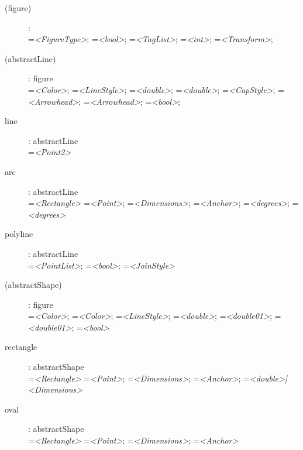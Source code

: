 \begin{description}

\item[(figure)]: \\
    =\textit{<FigureType>};
    =\textit{<bool>};
    =\textit{<TagList>};
    =\textit{<int>};
    =\textit{<Transform>};

\item[(abstractLine)]: figure \\
    =\textit{<Color>};
    =\textit{<LineStyle>};
    =\textit{<double>};
    =\textit{<double>};
    =\textit{<CapStyle>};
    =\textit{<Arrowhead>};
    =\textit{<Arrowhead>};
    =\textit{<bool>};

\item[line]: abstractLine \\
    =\textit{<Point2>}

\item[arc]: abstractLine \\
    =\textit{<Rectangle>}
    =\textit{<Point>};
    =\textit{<Dimensions>};
    =\textit{<Anchor>};
    =\textit{<degrees>};
    =\textit{<degrees>}

\item[polyline]: abstractLine \\
    =\textit{<PointList>};
    =\textit{<bool>};
    =\textit{<JoinStyle>}

\item[(abstractShape)]: figure \\
    =\textit{<Color>};
    =\textit{<Color>};
    =\textit{<LineStyle>};
    =\textit{<double>};
    =\textit{<double01>};
    =\textit{<double01>};
    =\textit{<bool>}

\item[rectangle]: abstractShape \\
    =\textit{<Rectangle>}
    =\textit{<Point>};
    =\textit{<Dimensions>};
    =\textit{<Anchor>};
    =\textit{<double>|<Dimensions>}

\item[oval]: abstractShape \\
    =\textit{<Rectangle>}
    =\textit{<Point>};
    =\textit{<Dimensions>};
    =\textit{<Anchor>}


\end{description}
